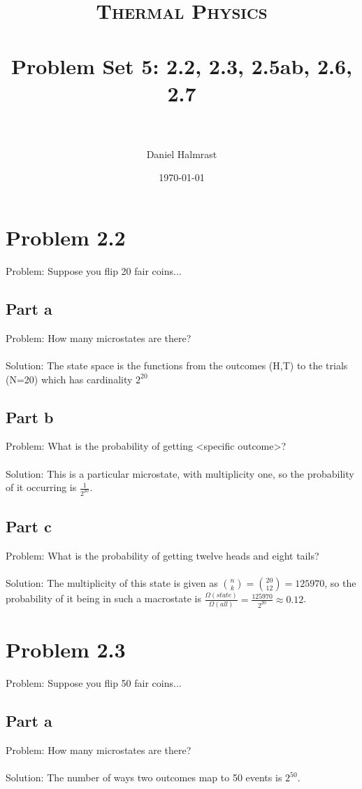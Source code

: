 \documentclass[paper=a4, fontsize=11pt]{scrartcl} %
\title{	
\normalfont \normalsize 
\textsc{Thermal Physics} \\ [25pt] %
\horrule{0.5pt} \\[0.4cm] %
\huge Problem Set 5: 2.2, 2.3, 2.5ab, 2.6, 2.7 \\ %
\horrule{2pt} \\[0.5cm] %
}
\author{Daniel Halmrast} %
\date{\normalsize\today} %
\numberwithin{equation}{section} %
\numberwithin{figure}{section} %
\numberwithin{table}{section} %
\begin{document}
\maketitle %


\section*{Problem 2.2}
Problem: Suppose you flip 20 fair coins...

\subsection*{Part a}
Problem: How many microstates are there?
\\
\\
Solution: The state space is the functions from the outcomes (H,T) to the trials (N=20)
which has cardinality $2^{20}$

\subsection*{Part b}
Problem: What is the probability of getting <specific outcome>?
\\
\\
Solution: This is a particular microstate, with multiplicity one, so the probability of
it occurring is $\frac{1}{2^{20}}$.

\subsection*{Part c}
Problem: What is the probability of getting twelve heads and eight tails?
\\
\\
Solution: The multiplicity of this state is given as $\binom{n}{k} = \binom{20}{12} = 125970$,
so the probability of it being in such a macrostate is 
$\frac{\Omega(state)}{\Omega(all)} = \frac{125970}{2^{20}} \approx 0.12$.

\section*{Problem 2.3}
Problem: Suppose you flip 50 fair coins...

\subsection*{Part a}
Problem: How many microstates are there?
\\
\\
Solution: The number of ways two outcomes map to 50 events is $2^{50}$.
\end{document}
